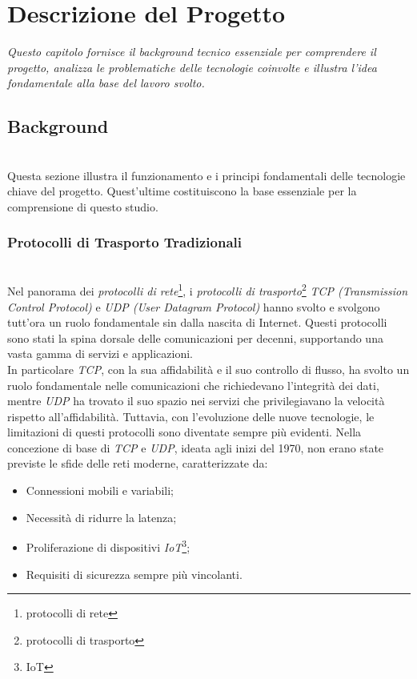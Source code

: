 \chapter{Descrizione del Progetto}
\label{cap:descrizione}

\textit{\indent Questo capitolo fornisce il background tecnico essenziale per comprendere il progetto, analizza le problematiche delle tecnologie coinvolte e illustra l'idea fondamentale alla base del lavoro svolto.}

\section{Background}

~\\
\indent Questa sezione illustra il funzionamento e i principi fondamentali delle tecnologie chiave del progetto.
Quest'ultime costituiscono la base essenziale per la comprensione di questo studio. 

\subsection{Protocolli di Trasporto Tradizionali}
~\\
\indent Nel panorama dei \emph{protocolli di rete}\footnote{\gls{protocolli di rete}}, i \emph{protocolli di trasporto}\footnote{\gls{protocolli di trasporto}} \emph{TCP (Transmission Control Protocol)}  e \emph{UDP (User Datagram Protocol)} hanno svolto e svolgono tutt'ora un ruolo fondamentale sin dalla nascita di Internet.
Questi protocolli sono stati la spina dorsale delle comunicazioni per decenni, supportando una vasta gamma di servizi e applicazioni.\\
In particolare \emph{TCP}, con la sua affidabilità e il suo controllo di flusso, ha svolto un ruolo fondamentale nelle comunicazioni che richiedevano l'integrità dei dati, mentre \emph{UDP} ha trovato il suo spazio nei servizi che privilegiavano la velocità rispetto all'affidabilità. 
Tuttavia, con l'evoluzione delle nuove tecnologie, le limitazioni di questi protocolli sono diventate sempre più evidenti. Nella concezione di base di \emph{TCP} e \emph{UDP}, ideata agli inizi del 1970, non erano state previste le sfide delle reti moderne, 
caratterizzate da:  
\begin{itemize}
    \item Connessioni mobili e variabili;
    
    \item Necessità di ridurre la latenza;
    
    \item Proliferazione di dispositivi \emph{IoT}\footnote{\gls{IoT}};
     
    \item Requisiti di sicurezza sempre più vincolanti.
\end{itemize}

